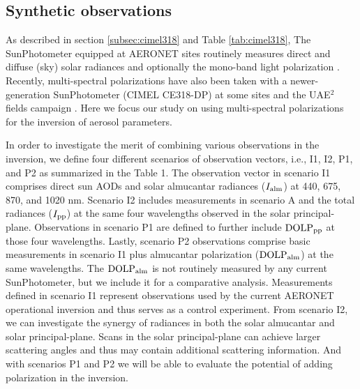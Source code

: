 \subsection{Synthetic observations}

As described in section \ref{subsec:cimel318} and Table \ref{tab:cimel318}, 
The SunPhotometer equipped at AERONET sites routinely measures direct and
diffuse (sky) solar radiances and optionally the mono-band light 
polarization \citep{Holben98}. Recently, multi-spectral polarizations 
have also been taken with a newer-generation SunPhotometer (CIMEL CE318-DP) 
at some sites \citep{Li09} and the UAE$^2$ fields campaign \citet{Reid08}.
 Here we focus our study on using multi-spectral polarizations 
for the inversion of aerosol parameters. 

In order to investigate the merit of combining various observations in the
inversion, we define four different scenarios of observation vectors, i.e., I1,
I2, P1, and P2 as summarized in the Table 1. The observation vector in scenario
I1 comprises direct sun AODs and solar almucantar radiances ($I_\text{alm}$) at 440,
675, 870, and 1020 nm. Scenario I2 includes measurements in scenario A and the
total radiances ($I_\text{pp}$) at the same four wavelengths observed in the solar
principal-plane. Observations in scenario P1 are defined to further include
$\text{DOLP}_\text{pp}$ at those four wavelengths. Lastly, scenario P2 observations comprise
basic measurements in scenario I1 plus almucantar polarization ($\text{DOLP}_\text{alm}$) at
the same wavelengths. The $\text{DOLP}_\text{alm}$ is not routinely measured by any current
SunPhotometer, but we include it for a comparative analysis. Measurements
defined in scenario I1 represent observations used by the current AERONET
operational inversion and thus serves as a control experiment. From scenario
I2, we can investigate the synergy of radiances in both the solar almucantar
and solar principal-plane. Scans in the solar principal-plane can achieve
larger scattering angles and thus may contain additional scattering
information. And with scenarios P1 and P2 we will be able to evaluate the
potential of adding polarization in the inversion. 

